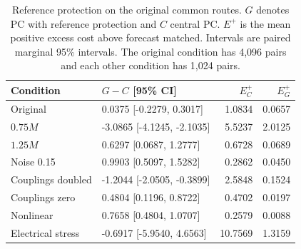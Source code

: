 \begin{table}[t]
\centering
\caption{Reference protection on the original common routes. $G$ denotes PC with reference protection and $C$ central PC. $E^+$ is the mean positive excess cost above forecast matched. Intervals are paired marginal 95\% intervals. The original condition has 4,096 pairs and each other condition has 1,024 pairs.}
\label{tab:guarded-primary}
\footnotesize\setlength{\tabcolsep}{3pt}\renewcommand{\arraystretch}{1.12}
\begin{tabular}{@{}p{}p{}rr@{}}
\toprule
Condition & $G-C$ [95\% CI] & $E_C^+$ & $E_G^+$ \\
\midrule
Original & 0.0375 [-0.2279, 0.3017] & 1.0834 & 0.0657 \\
$0.75M$ & -3.0865 [-4.1245, -2.1035] & 5.5237 & 2.0125 \\
$1.25M$ & 0.6297 [0.0687, 1.2777] & 0.6728 & 0.0689 \\
Noise 0.15 & 0.9903 [0.5097, 1.5282] & 0.2862 & 0.0450 \\
Couplings doubled & -1.2044 [-2.0505, -0.3899] & 2.5848 & 0.1524 \\
Couplings zero & 0.4804 [0.1196, 0.8722] & 0.4702 & 0.0197 \\
Nonlinear & 0.7658 [0.4804, 1.0707] & 0.2579 & 0.0088 \\
Electrical stress & -0.6917 [-5.9540, 4.6563] & 10.7569 & 1.3159 \\
\bottomrule
\end{tabular}
\end{table}
